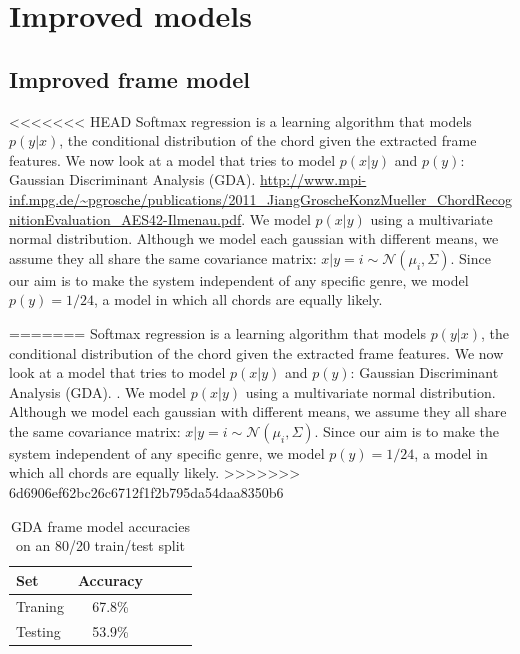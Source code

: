 \documentclass{article}
\begin{document}
\section{Improved models}
\subsection{Improved frame model}

<<<<<<< HEAD
Softmax regression is a learning algorithm that models $p(y|x)$, the conditional distribution of the chord given the extracted frame features. We now look at a model that tries to model $p(x|y)$ and $p(y)$: Gaussian Discriminant Analysis (GDA). \url{http://www.mpi-inf.mpg.de/~pgrosche/publications/2011_JiangGroscheKonzMueller_ChordRecognitionEvaluation_AES42-Ilmenau.pdf}. We model $p(x|y)$ using a multivariate normal distribution. Although we model each gaussian with different means, we assume they all share the same covariance matrix: $x|y=i \sim \mathcal{N}$$(\mu_i, \Sigma)$. Since our aim is to make the system independent of any specific genre, we model $p(y) = 1/24$, a model in which all chords are equally likely. 

=======
Softmax regression is a learning algorithm that models $p(y|x)$, the conditional distribution of the chord given the extracted frame features. We now look at a model that tries to model $p(x|y)$ and $p(y)$: Gaussian Discriminant Analysis (GDA). \cite{jiang}. We model $p(x|y)$ using a multivariate normal distribution. Although we model each gaussian with different means, we assume they all share the same covariance matrix: $x|y=i \sim \mathcal{N}$$(\mu_i, \Sigma)$. Since our aim is to make the system independent of any specific genre, we model $p(y) = 1/24$, a model in which all chords are equally likely. 
>>>>>>> 6d6906ef62bc26c6712f1f2b795da54daa8350b6
\begin{table}[t]
\caption{GDA frame model accuracies on an 80/20 train/test split}
\label{mfccvschroma}
\vskip 0.15in
\begin{center}
\begin{small}
\begin{sc}
\begin{tabular}{lcccr}
\hline
\abovespace\belowspace
Set & Accuracy \\
\hline
\abovespace
Traning    & 67.8\%\\
Testing & 53.9\%\\
\hline
\end{tabular}
\end{sc}
\end{small}
\end{center}
\vskip -0.1in
\end{table}
\end{document}
